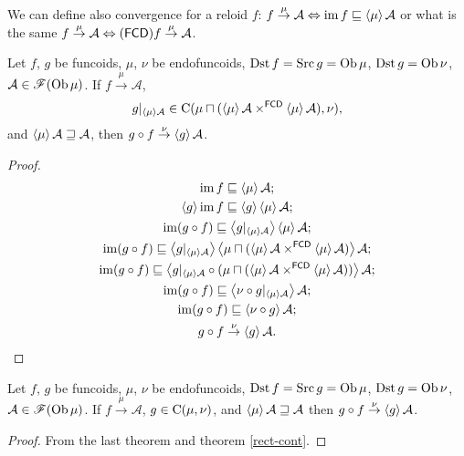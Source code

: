\begin{rem}
We can define also convergence for a reloid $f$: $f\overset{\mu}{\rightarrow}\mathcal{A}\Leftrightarrow\operatorname{im} f\sqsubseteq\left\langle \mu\right\rangle\mathcal{A}$
or what is the same $f\overset{\mu}{\rightarrow}\mathcal{A}\Leftrightarrow(\mathsf{FCD}) f\overset{\mu}{\rightarrow}\mathcal{A}$.\end{rem}
\begin{thm}
Let $f$, $g$ be funcoids, $\mu$, $\nu$ be endofuncoids, $\operatorname{Dst} f=\operatorname{Src} g=\operatorname{Ob}\mu$,
$\operatorname{Dst} g=\operatorname{Ob}\nu$, $\mathcal{A}\in\mathscr{F}(\operatorname{Ob}\mu)$. If $f\overset{\mu}{\rightarrow}\mathcal{A}$,
\[
g|_{\left\langle \mu\right\rangle\mathcal{A}}\in\mathrm{C}(\mu\sqcap(\left\langle \mu\right\rangle\mathcal{A}\times^{\mathsf{FCD}}\left\langle \mu\right\rangle\mathcal{A}),\nu),
\]
and $\left\langle \mu\right\rangle\mathcal{A}\sqsupseteq\mathcal{A}$, then $g\circ f\overset{\nu}{\rightarrow}\left\langle g\right\rangle\mathcal{A}$.\end{thm}
\begin{proof}
~
\begin{gather*}
\operatorname{im} f\sqsubseteq\left\langle \mu\right\rangle\mathcal{A};\\
\left\langle g\right\rangle\operatorname{im} f\sqsubseteq\left\langle g\right\rangle\left\langle \mu\right\rangle\mathcal{A};\\
\operatorname{im}(g\circ f)\sqsubseteq\left\langle g|_{\left\langle \mu\right\rangle\mathcal{A}}\right\rangle\left\langle \mu\right\rangle\mathcal{A};\\
\operatorname{im}(g\circ f)\sqsubseteq\left\langle g|_{\left\langle \mu\right\rangle\mathcal{A}}\right\rangle\left\langle \mu\sqcap(\left\langle \mu\right\rangle\mathcal{A}\times^{\mathsf{FCD}}\left\langle \mu\right\rangle\mathcal{A})\right\rangle\mathcal{A};\\
\operatorname{im}(g\circ f)\sqsubseteq\left\langle g|_{\left\langle \mu\right\rangle\mathcal{A}}\circ(\mu\sqcap(\left\langle \mu\right\rangle\mathcal{A}\times^{\mathsf{FCD}}\left\langle \mu\right\rangle\mathcal{A}))\right\rangle\mathcal{A};\\
\operatorname{im}(g\circ f)\sqsubseteq\left\langle \nu\circ g|_{\left\langle \mu\right\rangle\mathcal{A}}\right\rangle\mathcal{A};\\
\operatorname{im}(g\circ f)\sqsubseteq\left\langle \nu\circ g\right\rangle\mathcal{A};\\
g\circ f\overset{\nu}{\rightarrow}\left\langle g\right\rangle\mathcal{A}.
\end{gather*}
\end{proof}
\begin{cor}
Let $f$, $g$ be funcoids, $\mu$, $\nu$ be endofuncoids, $\operatorname{Dst} f=\operatorname{Src} g=\operatorname{Ob}\mu$,
$\operatorname{Dst} g=\operatorname{Ob}\nu$, $\mathcal{A}\in\mathscr{F}(\operatorname{Ob}\mu)$. If $f\overset{\mu}{\rightarrow}\mathcal{A}$,
$g\in\mathrm{C}(\mu,\nu)$, and $\left\langle \mu\right\rangle\mathcal{A}\sqsupseteq\mathcal{A}$
then $g\circ f\overset{\nu}{\rightarrow}\left\langle g\right\rangle\mathcal{A}$.\end{cor}
\begin{proof}
From the last theorem and theorem \ref{rect-cont}.
\end{proof}

